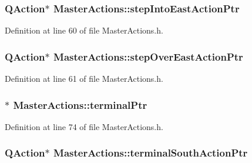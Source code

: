 \hypertarget{class_master_actions_acc473f35c8ee83c1d2d10d3a73522461}{
\subsubsection[{step\-Into\-East\-Action\-Ptr}]{\setlength{\rightskip}{0pt plus 5cm}Q\-Action$\ast$ Master\-Actions\-::step\-Into\-East\-Action\-Ptr\hspace{0.3cm}{\ttfamily [private]}}}\label{class_master_actions_acc473f35c8ee83c1d2d10d3a73522461}


Definition at line 60 of file Master\-Actions.\-h.

\hypertarget{class_master_actions_a2c51444dbd1ff60d23dd52cc6fb4a9f7}{
\subsubsection[{step\-Over\-East\-Action\-Ptr}]{\setlength{\rightskip}{0pt plus 5cm}Q\-Action$\ast$ Master\-Actions\-::step\-Over\-East\-Action\-Ptr\hspace{0.3cm}{\ttfamily [private]}}}\label{class_master_actions_a2c51444dbd1ff60d23dd52cc6fb4a9f7}


Definition at line 61 of file Master\-Actions.\-h.

\hypertarget{class_master_actions_accb886e749ad46cb6373187e59921bcf}{
\subsubsection[{terminal\-Ptr}]{$\ast$ Master\-Actions\-::terminal\-Ptr\hspace{0.3cm}{\ttfamily [private]}}}\label{class_master_actions_accb886e749ad46cb6373187e59921bcf}


Definition at line 74 of file Master\-Actions.\-h.

\hypertarget{class_master_actions_ad96c9f17230e162e9a9f39a867101a53}{
\subsubsection[{terminal\-South\-Action\-Ptr}]{\setlength{\rightskip}{0pt plus 5cm}Q\-Action$\ast$ Master\-Actions\-::terminal\-South\-Action\-Ptr\hspace{0.3cm}{\ttfamily [private]}}}\label{class_master_actions_ad96c9f17230e162e9a9f39a867101a53}


